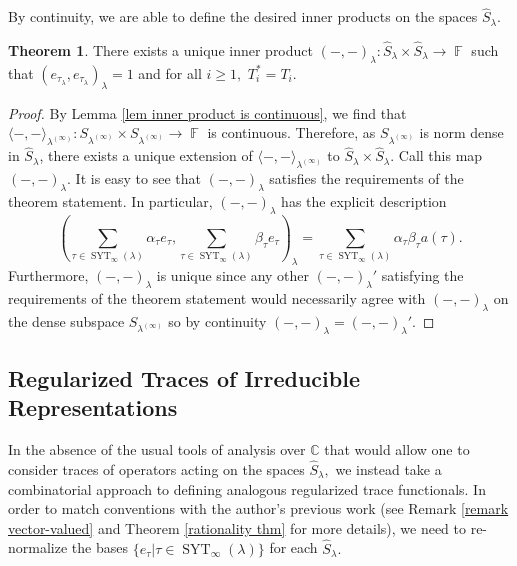 \documentclass[12pt,reqno]{amsart}
\theoremstyle{definition}
\newtheorem{thm}{Theorem}[section]
\DeclareMathOperator{\bF}{\mathbb{F}}
\DeclareMathOperator{\SYT}{\mathrm{SYT}}
\begin{document}
By continuity, we are able to define the desired inner products on the spaces $\hat{S}_{\lambda}.$

\begin{thm}\label{thm unique inner product}
    There exists a unique inner product $( -,-)_{\lambda}: \hat{S}_{\lambda} \times \hat{S}_{\lambda} \rightarrow \bF$ such that $( e_{\tau_{\lambda}}, e_{\tau_{\lambda}} )_{\lambda} = 1$ and for all $i \geq 1,$ $T_i^* = T_i.$
\end{thm}
\begin{proof}
    By Lemma \ref{lem inner product is continuous}, we find that $\langle -, - \rangle_{\lambda^{(\infty)}}:S_{\lambda^{(\infty)}}\times S_{\lambda^{(\infty)}} \rightarrow \bF$ is continuous. Therefore, as $S_{\lambda^{(\infty)}}$ is norm dense in $\hat{S}_{\lambda}$, there exists a unique extension of $\langle -, - \rangle_{\lambda^{(\infty)}}$ to $\hat{S}_{\lambda}\times \hat{S}_{\lambda}$. Call this map $( -,-)_{\lambda}.$ It is easy to see that $( -,-)_{\lambda}$ satisfies the requirements of the theorem statement. In particular, $(-,-)_{\lambda}$ has the explicit description 
    $$\left( \sum_{\tau \in \SYT_{\infty}(\lambda)} \alpha_{\tau} e_{\tau},  \sum_{\tau \in \SYT_{\infty}(\lambda)} \beta_{\tau} e_{\tau} \right)_{\lambda} = \sum_{\tau \in \SYT_{\infty}(\lambda)} \alpha_{\tau} \beta_{\tau} a(\tau).$$ 
    Furthermore, $( -,-)_{\lambda}$ is unique since any other $( -,-)_{\lambda}'$ satisfying the requirements of the theorem statement would necessarily agree with $( -,-)_{\lambda}$ on the dense subspace $S_{\lambda^{(\infty)}}$ so by continuity $( -,-)_{\lambda}= ( -,-)_{\lambda}'.$
\end{proof}



\subsection{Regularized Traces of Irreducible Representations}

In the absence of the usual tools of analysis over $\mathbb{C}$ that would allow one to consider traces of operators acting on the spaces $\hat{S}_{\lambda},$ we instead take a combinatorial approach to defining analogous regularized trace functionals. In order to match conventions with the author's previous work \cite{BWMurnaghan} (see Remark \ref{remark vector-valued} and Theorem \ref{rationality thm} for more details), we need to re-normalize the bases $\{ e_{\tau}|\tau \in \SYT_{\infty}(\lambda)\}$ for each $\hat{S}_{\lambda}.$
\end{document}
